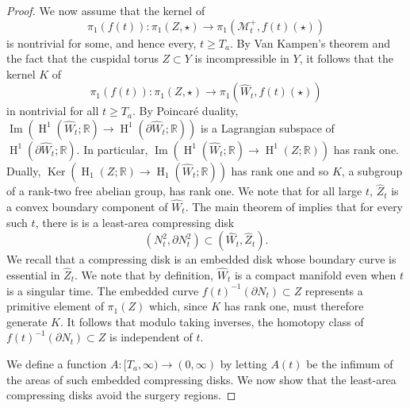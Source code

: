 \documentclass[12pt]{amsart}
\newcommand{\D}{\partial}
\newcommand{\HH}{\operatorname{H}}
\newcommand{\Image}{\operatorname{Im}}
\newcommand{\Ker}{\operatorname{Ker}}
\newcommand{\M}{{\mathcal M}}
\newcommand{\R}{{\mathbb R}}
\newcommand{\ra}{\rightarrow}
\numberwithin{equation}{section}
\theoremstyle{plain}
\theoremstyle{definition}
\theoremstyle{remark}
\begin{document}
\begin{proof}
\bigskip
We now assume that the kernel of
\begin{equation}
\pi_1(f(t)):\pi_1(Z,\star)\ra \pi_1(\M_t^+,f(t)(\star))
\end{equation}
is nontrivial for some, and hence every, $t\geq T_a$.  By Van Kampen's 
theorem and the fact that the cuspidal torus
$Z\subset Y$ is incompressible in $Y$, it follows that the kernel $K$
of 
\begin{equation}
\pi_1(f(t)):\pi_1(Z,\star)\ra \pi_1(\hat W_t,f(t)(\star))
\end{equation}
in nontrivial for all $t\geq T_a$.   By Poincar\'e duality, 
$\Image \left( \HH^1(\hat{W}_t; \R) \rightarrow \HH^1(\partial \hat{W}_t; \R) \right)$
is a Lagrangian subspace of $\HH^1(\partial \hat{W}_t; \R)$. In particular,
$\Image \left( \HH^1(\hat{W}_t; \R) \rightarrow \HH^1(Z; \R) \right)$
has
rank one. Dually,
$\Ker \left( \HH_1(Z; \R) \rightarrow \HH_1(\widehat{W}_t; \R) \right)$
has rank one and so $K$,
a subgroup of a rank-two free abelian group,
has rank one. We note that for all large $t$, 
$\hat{Z}_t$ is a convex 
boundary component of $\hat W_t$.
The main theorem of \cite{meeksyau}  implies that for 
every such $t$, there is
is a least-area compressing disk  
\begin{equation}
(N^2_t,\D N^2_t)\subset (\hat W_t,\hat Z_t).
\end{equation}
We  recall that a compressing disk is an embedded disk whose boundary curve is essential
in $\hat Z_t$. We note that by definition, $\hat W_t$ is a compact manifold
even when $t$ is a singular time.   
The embedded curve $f(t)^{-1}(\D N_t)\subset Z$ 
represents a primitive element of $\pi_1(Z)$ which,
since $K$ has  rank one, must therefore generate $K$.
It follows that
modulo taking inverses, the homotopy class of $f(t)^{-1}(\D N_t)\subset Z$ is independent of $t$. 

We define a function $A:[T_a,\infty)\ra (0,\infty)$
by letting $A(t)$ be the infimum of the areas of such embedded compressing disks.
We now show that the least-area compressing disks avoid the surgery regions.


\end{proof}
\end{document}
